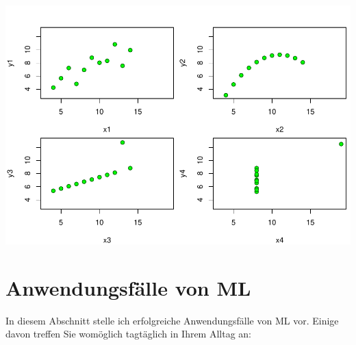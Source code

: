 \documentclass[
]{book}
\begin{document}
\includegraphics{01-intro_files/figure-latex/anscombe-1.pdf}

\hypertarget{anwendungsfuxe4lle-von-ml}{%
\section{Anwendungsfälle von ML}\label{anwendungsfuxe4lle-von-ml}}

In diesem Abschnitt stelle ich erfolgreiche Anwendungsfälle von ML vor. Einige davon treffen Sie womöglich tagtäglich in Ihrem Alltag an:
\end{document}
